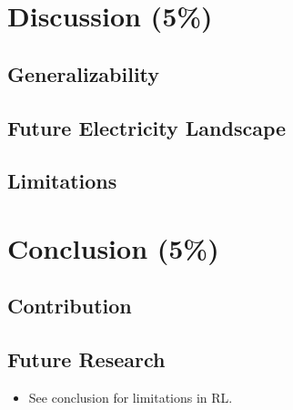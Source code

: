 \documentclass[12pt, article]{article}
\begin{document}
\section{Discussion (5\%)}
\label{sec:orgeafac31}
\subsection{Generalizability}
\label{sec:org4f2e92d}
\subsection{Future Electricity Landscape}
\label{sec:orgf3fdfb4}
\subsection{Limitations}
\label{sec:orgc5f6230}
\section{Conclusion (5\%)}
\label{sec:orgb219132}
\subsection{Contribution}
\label{sec:org31118d8}
\subsection{Future Research}
\label{sec:org5a4ca48}



\clearpage
\printbibliography

\begin{itemize}
\item See \parencite{vazquez-canteli19_reinf_learn_deman_respon} conclusion for
limitations in RL.
\end{itemize}
\end{document}
